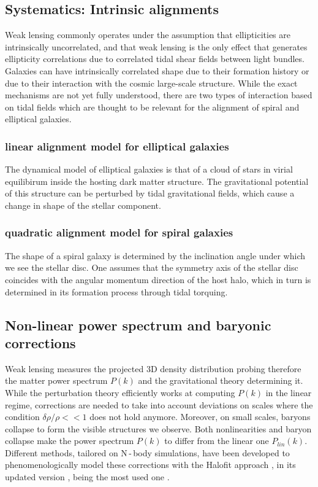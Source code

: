 \subsection{Systematics: Intrinsic alignments}
\label{sec:IA}

Weak lensing commonly operates under the assumption that ellipticities are intrinsically uncorrelated, and that weak lensing is the only effect that generates ellipticity correlations due to correlated tidal shear fields between light bundles. Galaxies can have intrinsically correlated shape due to their formation history or due to their interaction with the cosmic large-scale structure. While the exact mechanisms are not yet fully understood, there are two types of interaction based on tidal fields which are thought to be relevant for the alignment of spiral and elliptical galaxies.

\subsubsection{linear alignment model for elliptical galaxies}
The dynamical model of elliptical galaxies is that of a cloud of stars in virial equilibirum inside the hosting dark matter structure. The gravitational potential of this structure can be perturbed by tidal gravitational fields, which cause a change in shape of the stellar component. 


\subsubsection{quadratic alignment model for spiral galaxies}
The shape of a spiral galaxy is determined by the inclination angle under which we see the stellar disc. One assumes that the symmetry axis of the stellar disc coincides with the angular momentum direction of the host halo, which in turn is determined in its formation process through tidal torquing.



\subsection{Non-linear power spectrum and baryonic corrections}

Weak lensing measures the projected 3D density distribution probing therefore the matter power spectrum $P(k)$ and the gravitational theory determining it. While the perturbation theory efficiently works at computing $P(k)$ in the linear regime, corrections are needed to take into account deviations on scales where the condition $\delta \rho/\rho << 1$ does not hold anymore. Moreover, on small scales, baryons collapse to form the visible structures we observe. Both nonlinearities and baryon collapse make the power spectrum $P(k)$ to differ from the linear one $P_{lin}(k)$. Different methods, tailored on N\,-\,body simulations, have been developed to phenomenologically model these corrections with the Halofit approach \cite{HaloFit}, in its updated version \cite{Taka,Bird_Viel_Haehnelt_2012}, being the most used one .  

